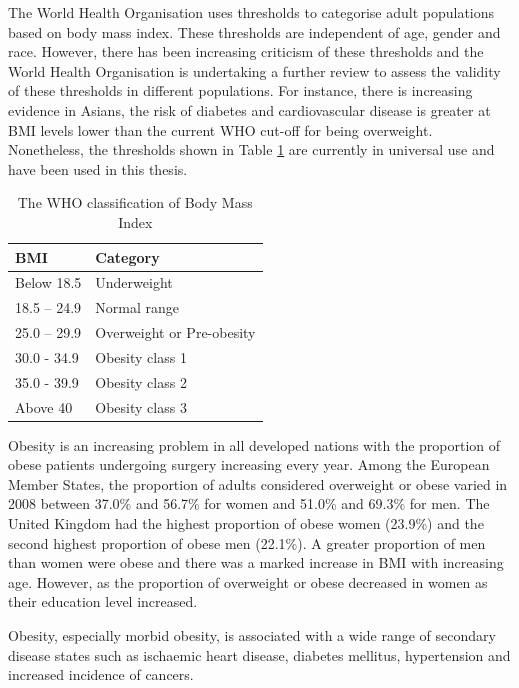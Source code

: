 The World Health Organisation uses thresholds to categorise adult populations based on body mass index. These thresholds are independent of age, gender and race. However, there has been increasing criticism of these thresholds and the World Health Organisation is undertaking a further review to assess the validity of these thresholds in different populations. For instance, there is increasing evidence in Asians, the risk of diabetes and cardiovascular disease is greater at BMI levels lower than the current WHO cut-off for being overweight. Nonetheless, the thresholds shown in Table \ref{table:bmi_who} are currently in universal use and have been used in this thesis.

\begin{table}[h]
	\centering
	\caption{The WHO classification of Body Mass Index}
	\label{table:bmi_who}
	\renewcommand{\arraystretch}{1.5} %
	\begin{tabular}{|l l|}
		\hline
		BMI         & Category                  \\ \hline
		Below 18.5  & Underweight               \\
		18.5 – 24.9 & Normal range              \\
		25.0 – 29.9 & Overweight or Pre-obesity \\
		30.0 - 34.9 & Obesity class 1             \\
		35.0 - 39.9 & Obesity class 2             \\
		Above 40    & Obesity class 3             \\ \hline
	\end{tabular}
\end{table}

Obesity is an increasing problem in all developed nations with the proportion of obese patients undergoing surgery increasing every year. Among the European Member States, the proportion of adults  considered overweight or obese varied in 2008 between  37.0\% and 56.7\% for women and 51.0\% and 69.3\% for men. The United Kingdom had the highest proportion of obese women (23.9\%) and the second highest proportion of obese men (22.1\%). A greater proportion of men than women were obese and there was a marked increase in BMI with increasing age. However, as the proportion of overweight or obese decreased in women as their education level increased. 

Obesity, especially morbid obesity, is associated with a wide range of secondary disease states such as ischaemic heart disease, diabetes mellitus, hypertension and increased incidence of cancers. 

